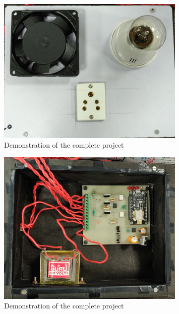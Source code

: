 			\begin{figure}[H]
				\centering
				\includegraphics[width=0.8\textwidth]{photos/hardware/sb_off.jpg}
				\caption{Demonstration of the complete project}
			\end{figure}  
			\begin{figure}[H]
				\centering
				\includegraphics[width=0.8\textwidth]{photos/hardware/sb_in.jpg}
				\caption{Demonstration of the complete project}
			\end{figure}  